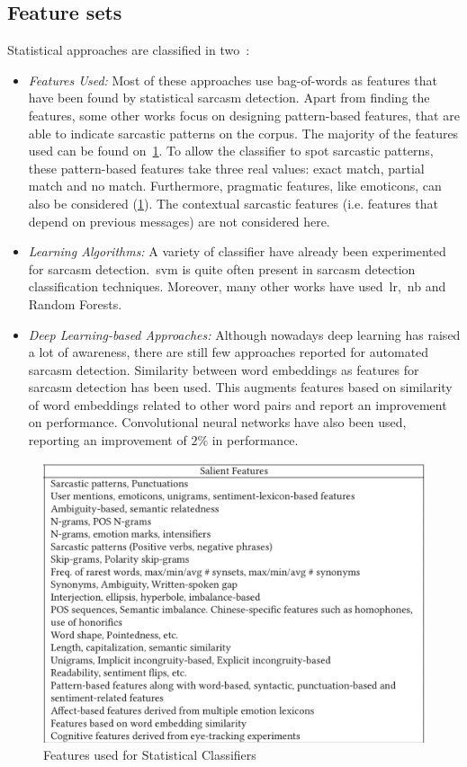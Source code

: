 \subsection{Feature sets}
Statistical approaches are classified in two~\cite{joshi2017automatic}:
\begin{itemize}
	\item \textit{Features Used:} Most of these approaches use bag-of-words as features that have been found by statistical sarcasm detection. Apart from finding the features, some other works focus on designing pattern-based features, that are able to indicate sarcastic patterns on the corpus. The majority of the features used can be found on~\cref{fig:featused}. To allow the classifier to spot sarcastic patterns, these pattern-based features take three real values: exact match, partial match and no match. Furthermore, pragmatic features, like emoticons, can also be considered (\cref{fig:featused}). The contextual sarcastic features (i.e. features that depend on previous messages) are not considered here.
	\item \textit{Learning Algorithms:} A variety of classifier have already been experimented for sarcasm detection.~\acf{svm} is quite often present in sarcasm detection classification techniques. Moreover, many other works have used~\acf{lr},~\acf{nb} and Random Forests.
	\item \textit{Deep Learning-based Approaches:} Although nowadays deep learning has raised a lot of awareness, there are still few approaches reported for automated sarcasm detection. Similarity between word embeddings as features for sarcasm detection has been used. This augments features based on similarity of word embeddings related to other word pairs and report an improvement on performance. Convolutional neural networks have also been used, reporting an improvement of $2\%$ in performance.
\end{itemize}
\begin{figure}
\centering
\includegraphics[scale=0.25]{img/features.jpeg}
\caption{Features used for Statistical Classifiers~\cite{joshi2017automatic}}
\label{fig:featused}
\end{figure}
